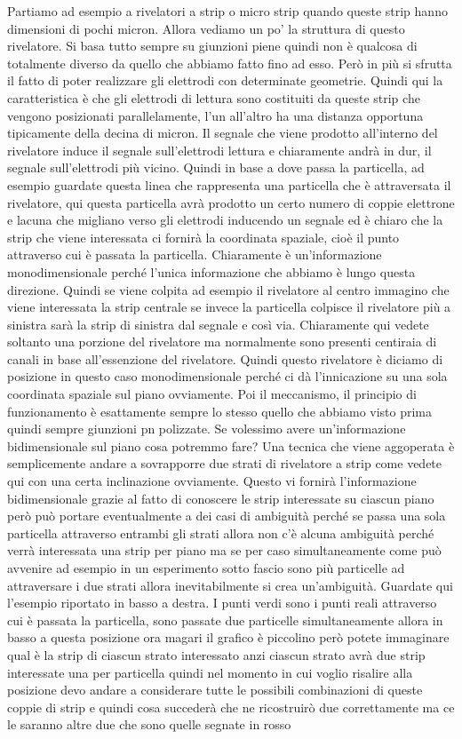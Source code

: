 {Partiamo ad esempio a rivelatori a strip o micro strip quando queste strip hanno dimensioni di pochi micron. Allora vediamo un po' la struttura di questo rivelatore. Si basa tutto sempre su giunzioni piene quindi non è qualcosa di totalmente diverso da quello che abbiamo fatto fino ad esso. Però in più si sfrutta il fatto di poter realizzare gli elettrodi con determinate geometrie. Quindi qui la caratteristica è che gli elettrodi di lettura sono costituiti da queste strip che vengono posizionati parallelamente, l'un all'altro ha una distanza opportuna tipicamente della decina di micron. Il segnale che viene prodotto all'interno del rivelatore induce il segnale sull'elettrodi lettura e chiaramente andrà in dur, il segnale sull'elettrodi più vicino. Quindi in base a dove passa la particella, ad esempio guardate questa linea che rappresenta una particella che è attraversata il rivelatore, qui questa particella avrà prodotto un certo numero di coppie elettrone e lacuna che migliano verso gli elettrodi inducendo un segnale ed è chiaro che la strip che viene interessata ci fornirà la coordinata spaziale, cioè il punto attraverso cui è passata la particella. Chiaramente è un'informazione monodimensionale perché l'unica informazione che abbiamo è lungo questa direzione. Quindi se viene colpita ad esempio il rivelatore al centro immagino che viene interessata la strip centrale se invece la particella colpisce il rivelatore più a sinistra sarà la strip di sinistra dal segnale e così via. Chiaramente qui vedete soltanto una porzione del rivelatore ma normalmente sono presenti centiraia di canali in base all'essenzione del rivelatore. Quindi questo rivelatore è diciamo di posizione in questo caso monodimensionale perché ci dà l'innicazione su una sola coordinata spaziale sul piano ovviamente. Poi il meccanismo, il principio di funzionamento è esattamente sempre lo stesso quello che abbiamo visto prima quindi sempre giunzioni pn polizzate. Se volessimo avere un'informazione bidimensionale sul piano cosa potremmo fare? Una tecnica che viene aggoperata è semplicemente andare a sovrapporre due strati di rivelatore a strip come vedete qui con una certa inclinazione ovviamente. Questo vi fornirà l'informazione bidimensionale grazie al fatto di conoscere le strip interessate su ciascun piano però può portare eventualmente a dei casi di ambiguità perché se passa una sola particella attraverso entrambi gli strati allora non c'è alcuna ambiguità perché verrà interessata una strip per piano ma se per caso simultaneamente come può avvenire ad esempio in un esperimento sotto fascio sono più particelle ad attraversare i due strati allora inevitabilmente si crea un'ambiguità. Guardate qui l'esempio riportato in basso a destra. I punti verdi sono i punti reali attraverso cui è passata la particella, sono passate due particelle simultaneamente allora in basso a questa posizione ora magari il grafico è piccolino però potete immaginare qual è la strip di ciascun strato interessato anzi ciascun strato avrà due strip interessate una per particella quindi nel momento in cui voglio risalire alla posizione devo andare a considerare tutte le possibili combinazioni di queste coppie di strip e quindi cosa succederà che ne ricostruirò due correttamente ma ce le saranno altre due che sono quelle segnate in rosso }
